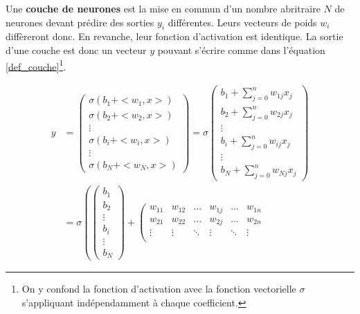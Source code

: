 \documentclass[12pt, french, twoside]{report}
\begin{document}
Une \textbf{couche de neurones} est la mise en commun d'un nombre abritraire $N$ de neurones devant prédire des sorties $y_i$ différentes. Leurs vecteurs de poids $w_i$ diffèreront donc. En revanche, leur fonction d'activation est identique. La sortie d'une couche est donc un vecteur $y$ pouvant s'écrire comme dans l'équation \ref{def_couche}\footnote{On y confond la fonction d'activation avec la fonction vectorielle $\sigma$ s'appliquant indépendamment à chaque coefficient.}.

\begin{equation} \label{def_couche}
    \begin{split}
        y & =
        \left(\begin{matrix}
            \sigma(b_1 + <w_1, x>) \\
            \sigma(b_2 + <w_2, x>) \\
            \vdots \\
            \sigma(b_i + <w_i, x>) \\
            \vdots \\
            \sigma(b_N + <w_N, x>)
        \end{matrix}\right)
        =
        \sigma\left(\begin{matrix}
            b_1 + \sum_{j=0}^{n} w_{1j}x_j \\
            b_2 + \sum_{j=0}^{n} w_{2j}x_j \\
            \vdots \\
            b_i + \sum_{j=0}^{n} w_{ij}x_j \\
            \vdots \\
            b_N + \sum_{j=0}^{n} w_{Nj}x_j
        \end{matrix}\right)\\
        & = \sigma\left(
            \left(\begin{matrix}
                b_1 \\ b_2 \\ \vdots \\ b_i \\ \vdots \\ b_N
            \end{matrix}\right)
            +
            \left(\begin{matrix}
                w_{11} & w_{12} & \hdots & w_{1j} & \hdots & w_{1n} \\
                w_{21} & w_{22} & \hdots & w_{2j} & \hdots & w_{2n} \\
                \vdots & \vdots & \ddots & \vdots & \ddots & \vdots \\

\end{matrix}
\end{split}
\end{equation}
\end{document}
